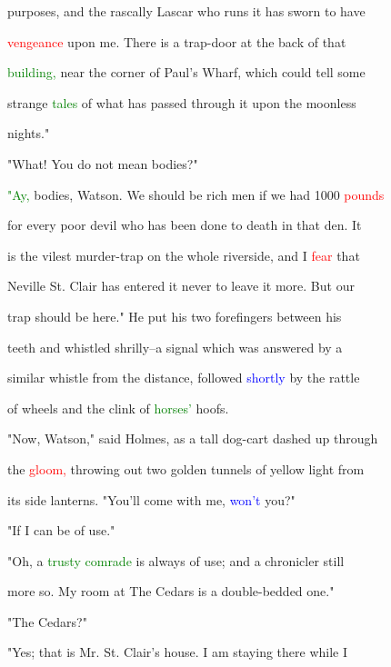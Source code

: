  purposes, and the rascally Lascar who runs it has sworn to have

 \textcolor{red}{vengeance} upon me. There is a trap-door at the back of that

 \textcolor{green}{building,} near the corner of Paul's Wharf, which could tell some

 strange \textcolor{green}{tales} of what has passed through it upon the moonless

 nights."



 "What! You do not mean bodies?"



 \textcolor{green}{"Ay,} bodies, Watson. We should be rich men if we had 1000 \textcolor{red}{pounds}

 for every poor \textcolor{BurntOrange}{devil} who has been done to \textcolor{BurntOrange}{death} in that den. It

 is the vilest murder-trap on the whole riverside, and I \textcolor{red}{fear} that

 Neville St. Clair has entered it never to \textcolor{BurntOrange}{leave} it more. But our

 trap should be here." He put his two forefingers between his

 teeth and whistled shrilly--a signal which was answered by a

 similar whistle from the distance, followed \textcolor{blue}{shortly} by the rattle

 of wheels and the clink of \textcolor{green}{horses'} hoofs.



 "Now, Watson," said Holmes, as a tall dog-cart dashed up through

 the \textcolor{red}{gloom,} throwing out two golden tunnels of yellow light from

 its side lanterns. "You'll come with me, \textcolor{blue}{won't} you?"



 "If I can be of use."



 "Oh, a \textcolor{green}{trusty} \textcolor{green}{comrade} is always of use; and a chronicler still

 more so. My room at The Cedars is a double-bedded one."



 "The Cedars?"



 "Yes; that is Mr. St. Clair's house. I am staying there while I

